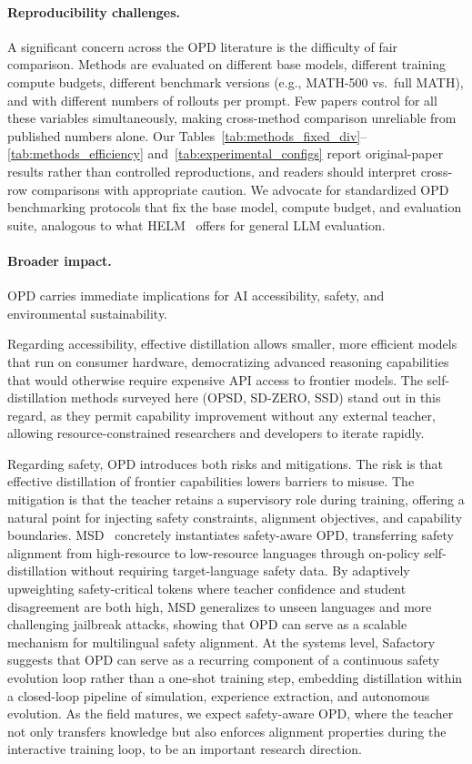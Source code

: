 \documentclass{article} %
\begin{document}
\paragraph{Reproducibility challenges.} A significant concern across the OPD literature is the difficulty of fair comparison. Methods are evaluated on different base models, different training compute budgets, different benchmark versions (e.g., MATH-500 vs.~full MATH), and with different numbers of rollouts per prompt. Few papers control for all these variables simultaneously, making cross-method comparison unreliable from published numbers alone. Our Tables~\ref{tab:methods_fixed_div}--\ref{tab:methods_efficiency} and~\ref{tab:experimental_configs} report original-paper results rather than controlled reproductions, and readers should interpret cross-row comparisons with appropriate caution. We advocate for standardized OPD benchmarking protocols that fix the base model, compute budget, and evaluation suite, analogous to what HELM~\citep{2211.09110} offers for general LLM evaluation.

\paragraph{Broader impact.} OPD carries immediate implications for AI accessibility, safety, and environmental sustainability.

Regarding accessibility, effective distillation allows smaller, more efficient models that run on consumer hardware, democratizing advanced reasoning capabilities that would otherwise require expensive API access to frontier models. The self-distillation methods surveyed here (OPSD, SD-ZERO, SSD) stand out in this regard, as they permit capability improvement without any external teacher, allowing resource-constrained researchers and developers to iterate rapidly.

Regarding safety, OPD introduces both risks and mitigations. The risk is that effective distillation of frontier capabilities lowers barriers to misuse. The mitigation is that the teacher retains a supervisory role during training, offering a natural point for injecting safety constraints, alignment objectives, and capability boundaries. MSD~\citep{2605.02971} concretely instantiates safety-aware OPD, transferring safety alignment from high-resource to low-resource languages through on-policy self-distillation without requiring target-language safety data. By adaptively upweighting safety-critical tokens where teacher confidence and student disagreement are both high, MSD generalizes to unseen languages and more challenging jailbreak attacks, showing that OPD can serve as a scalable mechanism for multilingual safety alignment. At the systems level, Safactory~\citep{2605.06230} suggests that OPD can serve as a recurring component of a continuous safety evolution loop rather than a one-shot training step, embedding distillation within a closed-loop pipeline of simulation, experience extraction, and autonomous evolution. As the field matures, we expect safety-aware OPD, where the teacher not only transfers knowledge but also enforces alignment properties during the interactive training loop, to be an important research direction.
\end{document}
